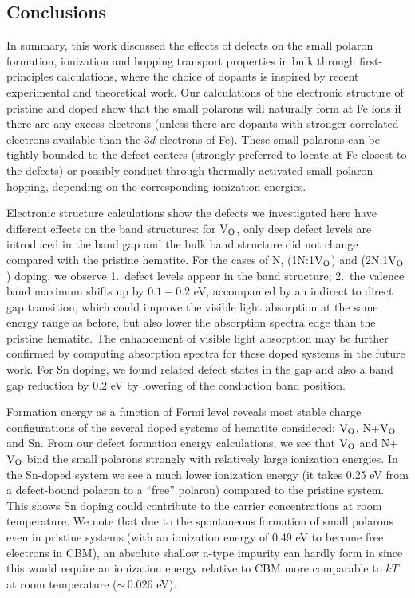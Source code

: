 
\subsection{Conclusions}

In summary, this work discussed the effects of defects on the small polaron formation, ionization and hopping transport properties in bulk  through first-principles calculations, where the choice of dopants is inspired by recent experimental and theoretical work\cite{forster2015oxygen,ling2011sn,wang2011facile,kim2015simultaneous}. Our calculations of the electronic structure of pristine and doped  show that the small polarons will naturally form at Fe ions if there are any excess electrons (unless there are dopants with stronger correlated electrons available than the $3d$ electrons of Fe). These small polarons can be tightly bounded to the defect centers (strongly preferred to locate at Fe closest to the defects) or possibly conduct through thermally activated small polaron hopping, depending on the corresponding ionization energies.

Electronic structure calculations show the defects we investigated here have different effects on the band structures: for $\text{V}_\text{O}$, only deep defect levels are introduced in the band gap and the bulk band structure did not change compared with the pristine hematite. For the cases of N,  (1N:1$\text{V}_\text{O}$) and (2N:1$\text{V}_\text{O}$) doping, we observe 1.\ defect levels appear in the band structure; 2.\ the valence band maximum shifts up by $0.1-0.2$ eV, accompanied by an indirect to direct gap transition, which could improve the visible light absorption at the same energy range as before, but also lower the absorption spectra edge than the pristine hematite. The enhancement of visible light absorption may be further confirmed by computing absorption spectra for these doped systems in the future work. For Sn doping, we found related defect states in the gap and also a band gap reduction by 0.2 eV by lowering of the conduction band position.

Formation energy as a function of Fermi level reveals most stable charge configurations of the several doped systems of hematite considered: $\text{V}_\text{O}$, N+$\text{V}_\text{O}$ and Sn. From our defect formation energy calculations, we see that $\text{V}_\text{O}$ and N+$\text{V}_\text{O}$ bind the small polarons strongly with relatively large ionization energies. In the Sn-doped system we see a much lower ionization energy (it takes 0.25 eV from a defect-bound polaron to a ``free'' polaron) compared to the pristine system. This shows Sn doping could contribute to the carrier concentrations at room temperature. We note that due to the spontaneous formation of small polarons even in pristine systems (with an ionization energy of 0.49 eV to become free electrons in CBM), an absolute shallow n-type impurity can hardly form in  since this would require an ionization energy relative to CBM more comparable to $kT$ at room temperature ($\sim\,$0.026 eV).

